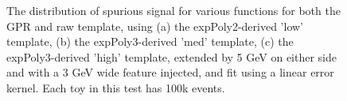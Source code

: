 \begin{figure} 
\begin{center}

\caption{The distribution of spurious signal for various functions for both the GPR and raw template, using (a) the expPoly2-derived 'low' template, (b) the expPoly3-derived 'med' template, (c) the expPoly3-derived 'high' template, extended by 5 GeV on either side and with a 3 GeV wide feature injected, and fit using a linear error kernel. Each toy in this test has 100k events.}
\label{fig:linearkernel_lowpt_100k_Sig}
\end{center}
\end{figure}

